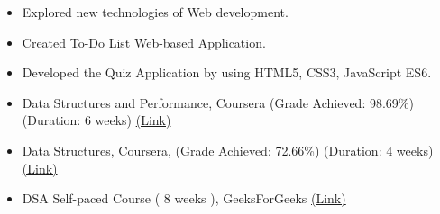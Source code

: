 




\begin{itemize}
\item Explored new technologies of Web development.
\item Created To-Do List Web-based Application. 

\end{itemize}
\divider
{}
\begin{itemize}
\item Developed the Quiz Application by using HTML5, CSS3, JavaScript ES6.
 \divider

\end{itemize}

\begin{itemize}
    \item Data Structures and Performance, Coursera (Grade Achieved: 98.69\%) (Duration: 6 weeks) \href{https://www.coursera.org/account/accomplishments/certificate/AAXN3RNBYFBN}{\hspace{0.1cm}(Link)}
    \item Data Structures, Coursera, (Grade Achieved: 72.66\%) (Duration: 4 weeks) \href{https://www.coursera.org/account/accomplishments/certificate/ZW7UWYQTLK4Z}{\hspace{0.1cm}(Link)}
    \item DSA Self-paced Course ( 8 weeks ), GeeksForGeeks \href{https://www.coursera.org/account/accomplishments/certificate/ZW7UWYQTLK4Z}{\hspace{0.1cm}(Link)}
\end{itemize}

\divider

